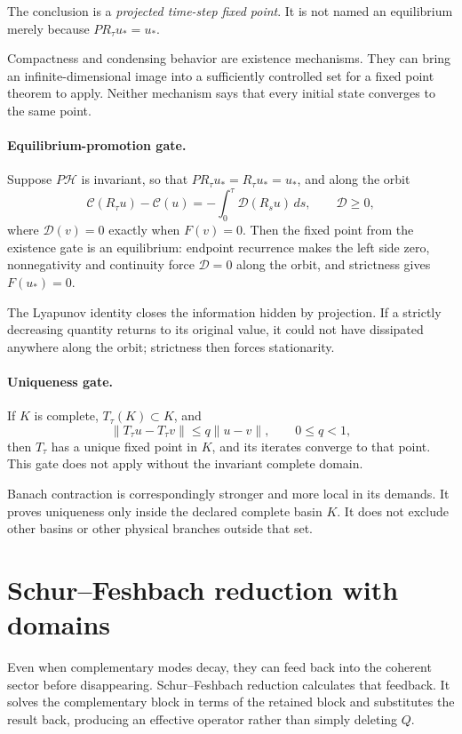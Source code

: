 \documentclass[11pt]{article}
\begin{document}
The conclusion is a \emph{projected time-step fixed point}. It is not named an
equilibrium merely because $P R_\tau u_\ast=u_\ast$.

Compactness and condensing behavior are existence mechanisms. They can bring
an infinite-dimensional image into a sufficiently controlled set for a fixed
point theorem to apply. Neither mechanism says that every initial state
converges to the same point.

\paragraph{Equilibrium-promotion gate.}
Suppose $P\mathcal H$ is invariant, so that
$P R_\tau u_\ast=R_\tau u_\ast=u_\ast$, and along the orbit
\[
 \mathcal C(R_\tau u)-\mathcal C(u)
 =-\int_0^\tau\mathcal D(R_su)\,ds,
 \qquad\mathcal D\ge0,
\]
where $\mathcal D(v)=0$ exactly when $F(v)=0$. Then the fixed point from
the existence gate is an equilibrium: endpoint recurrence makes the left
side zero, nonnegativity and continuity force $\mathcal D=0$ along the orbit,
and strictness gives $F(u_\ast)=0$.

The Lyapunov identity closes the information hidden by projection. If a
strictly decreasing quantity returns to its original value, it could not have
dissipated anywhere along the orbit; strictness then forces stationarity.

\paragraph{Uniqueness gate.}
If $K$ is complete, $T_\tau(K)\subset K$, and
\[
 \|T_\tau u-T_\tau v\|\le q\|u-v\|,
 \qquad0\le q<1,
\]
then $T_\tau$ has a unique fixed point in $K$, and its iterates converge to
that point. This gate does not apply without the invariant complete domain.

Banach contraction is correspondingly stronger and more local in its demands.
It proves uniqueness only inside the declared complete basin $K$. It does not
exclude other basins or other physical branches outside that set.

\section{Schur--Feshbach reduction with domains}

Even when complementary modes decay, they can feed back into the coherent
sector before disappearing. Schur--Feshbach reduction calculates that
feedback. It solves the complementary block in terms of the retained block
and substitutes the result back, producing an effective operator rather than
simply deleting $Q$.
\end{document}
